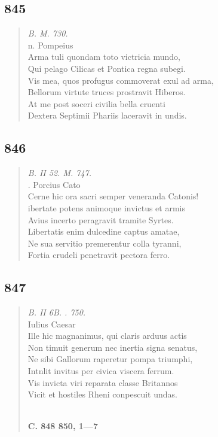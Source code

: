 \documentclass[11pt, a4paper]{report}
\begin{document}
            \subsection*{845}
      \begin{verse}
      \textit{B. M. 730.} \\ n. Pompeius \\ Arma tuli quondam toto victricia mundo, \\ Qui pelago Cilicas et Pontica regna subegi. \\ Vis mea, quos profugus commoverat exul ad arma, \\ Bellorum virtute truces prostravit Hiberos. \\ At me post soceri civilia bella cruenti \\ Dextera Septimii Phariis laceravit in undis. \\ 
      \end{verse}
  
            \subsection*{846}
      \begin{verse}
      \textit{B. II 52. M. 747.} \\ . Porcius Cato \\ Cerne hic ora sacri semper veneranda Catonis! \\ ibertate potens animoque invictus et armis \\ Avius incerto peragravit tramite Syrtes. \\ Libertatis enim dulcedine captus amatae, \\ Ne sua servitio premerentur colla tyranni, \\ Fortia crudeli penetravit pectora ferro. \\ 
      \end{verse}
  
            \subsection*{847}
      \begin{verse}
      \textit{B. II 6B. . 750.} \\ Iulius Caesar \\ Ille hic magnanimus, qui claris arduus actis \\ Non timuit generum nec inertia signa senatus, \\ Ne sibi Gallorum raperetur pompa triumphi, \\ Intnlit invitus per civica viscera ferrum. \\ Vis invicta viri reparata classe Britannos \\ Vicit et hostiles Rheni conpescuit undas. \\ 
        ﻿\pagebreak 
    \begin{center} \textbf{C. 848 850, 1—7} \end{center} \marginpar{[307]} 
      \end{verse}
  
\end{document}
